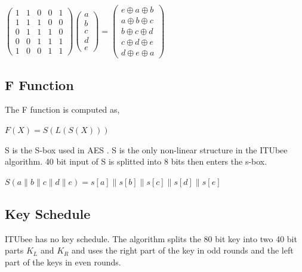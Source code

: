 \begin{center}
    $
    \begin{pmatrix}
    1 & 1 & 0 & 0 & 1 \\
    1 & 1 & 1 & 0 & 0 \\
    0 & 1 & 1 & 1 & 0 \\
    0 & 0 & 1 & 1 & 1 \\
    1 & 0 & 0 & 1 & 1
    \end{pmatrix}
    \begin{pmatrix}
    a \\
    b \\
    c \\
    d \\
    e
    \end{pmatrix}
    =
    \begin{pmatrix}
    e \oplus a \oplus b \\
    a \oplus b \oplus c \\
    b \oplus c \oplus d \\
    c \oplus d \oplus e \\
    d \oplus e \oplus a
    \end{pmatrix}
    $
\end{center}


\subsection{F Function}
The F function is computed as,\\
\begin{center}
    $F (X) = S(L(S(X)))$
\end{center}

S is the S-box used in AES \cite{dworkin2001advanced}. S is the only non-linear structure in the ITUbee algorithm.  40 bit input of S is splitted into 8 bits then enters the s-box.
\begin{center}
    $S(a\parallel b \parallel c \parallel d \parallel e) = s[a] \parallel s[b] \parallel s[c] \parallel s[d] \parallel s[e]$ 
\end{center}

\subsection{Key Schedule}

ITUbee has no key schedule. The algorithm splits the 80 bit key into two 40 bit parts $K_L$ and $K_R$ and uses the right part of the key in odd rounds and the left part of the keys in even rounds.


